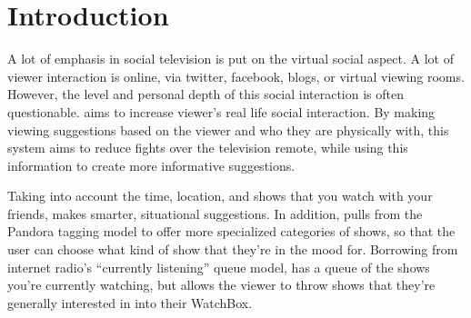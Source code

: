 \section{Introduction}

A lot of emphasis in social television is put on the virtual social
aspect.  A lot of viewer interaction is online, via twitter, facebook,
blogs, or virtual viewing rooms.  However, the level and personal
depth of this social interaction is often questionable.  {\sys} aims
to increase viewer’s real life social interaction.  By making viewing
suggestions based on the viewer and who they are physically with, this
system aims to reduce fights over the television remote, while using
this information to create more informative suggestions.

Taking into account the time, location, and shows that you watch with
your friends, {\sys} makes smarter, situational suggestions.  In
addition, {\sys} pulls from the Pandora tagging model to offer more
specialized categories of shows, so that the user can choose what kind
of show that they’re in the mood for.  Borrowing from internet radio’s
“currently listening” queue model, {\sys} has a queue of the shows
you’re currently watching, but allows the viewer to throw shows that
they’re generally interested in into their WatchBox.
